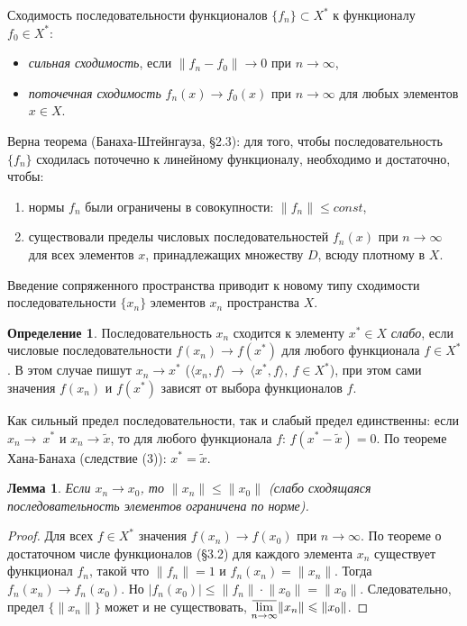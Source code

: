 \documentclass[12pt,a4paper,titlepage,oneside]{book}
\newcommand{\overbar}[1]{\mkern 1.5mu\overline{\mkern-1.5mu#1\mkern-1.5mu}\mkern 1.5mu}
\theoremstyle{definition}
\newtheorem*{definition}{Определение}
\theoremstyle{plain}
\theoremstyle{break}
\theoremstyle{remark}
\theoremstyle{remark}
\theoremstyle{remark}
\theoremstyle{remark}
\theoremstyle{plain}
\newtheorem*{lemma}{Лемма}
\theoremstyle{plain}
\begin{document}
Сходимость последовательности функционалов $\{f_n\} \subset X^*$ к функционалу $f_0\in X^*$:
\begin{itemize}
	\item \textit{сильная сходимость}, если $\lVert f_n - f_0\rVert \to 0$ при $n\to\infty$,
	
	\item \textit{поточечная сходимость} $f_n(x)\to f_0(x)$ при $n\to\infty$ для любых элементов $x\in X$.
\end{itemize}
Верна теорема (Банаха-Штейнгауза, \S 2.3): для того, чтобы последовательность $\{ f_n \}$ сходилась поточечно к линейному функционалу, необходимо и достаточно, чтобы:

\begin{enumerate}
\item нормы $f_n$ были ограничены в совокупности: $\lVert f_n\rVert \leqslant const$,
\item существовали пределы числовых последовательностей $f_n(x)$ при $n\to\infty$ для всех элементов $x$, принадлежащих множеству $D$, всюду плотному в $X$.
\end{enumerate}

Введение сопряженного пространства приводит к новому типу сходимости последовательности $\{x_n\}$ элементов $x_n$ пространства $X$.

\begin{definition}
Последовательность $x_n$ сходится к элементу $x^* \in X$ \textit{слабо}, если числовые последовательности $f(x_n) \to f(x^*)$ для любого функционала $f \in X^*$. В этом случае пишут $x_n \to x^*$ \big($ \langle x_n,f \rangle  \ \to \  \langle x^*, f \rangle ,\ f \in X^*$\big), при этом сами значения $f(x_n)$ и $f(x^*)$ зависят от выбора функционалов $f$.
\end{definition}
Как сильный предел последовательности, так и слабый предел единственны: если $x_n\to~x^*$ и $x_n \to \widetilde{x}$, то для любого функционала $f$: $f(x^*-\widetilde{x})=0$. По теореме Хана-Банаха (следствие (3)): $x^*=\widetilde{x}$.

\begin{lemma}
Если $x_n \to x_0$, то $\lVert x_n \rVert \leqslant \lVert x_0 \rVert$ (слабо сходящаяся последовательность элементов ограничена по норме).
\end{lemma}
\begin{proof}
Для всех $f \in X^*$ значения $f(x_n) \to f(x_0)$ при $n \to \infty$. По теореме о достаточном числе функционалов (\S 3.2) для каждого элемента $x_n$ существует функционал $f_n$, такой что $\lVert f_n \rVert =1$ и $f_n(x_n)=\lVert x_n \rVert$. Тогда $f_n(x_n) \to f_n(x_0)$. Но $|f_n(x_0)| \leqslant \lVert f_n \rVert \cdot \lVert x_0 \rVert = \lVert x_0 \rVert$. Следовательно, предел $\{ \lVert x_n \rVert \}$ может и не существовать, $\overbar{\lim \limits_{n \to \infty}}\lVert x_n \rVert \leqslant \lVert x_0 \rVert$.
\end{proof}
\end{document}
